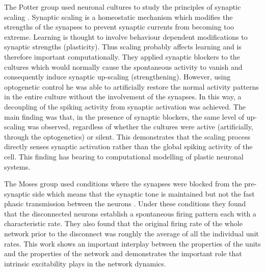     The Potter group used neuronal cultures to study the principles of synaptic scaling \cite{fong2015upward}. Synaptic scaling is a homeostatic mechanism which modifies the strengths of the synapses to prevent synaptic currents from becoming too extreme. Learning is thought to involve behaviour dependent modifications to synaptic strengths (plasticity). Thus scaling probably affects learning and is therefore important computationally. They applied synaptic blockers to the cultures which would normally cause the spontaneous activity to vanish and consequently induce synaptic up-scaling (strengthening). However, using optogenetic control he was able to artificially restore the normal activity patterns in the entire culture without the involvement of the synapses. In this way, a decoupling of the spiking activity from synaptic activation was achieved. The main finding was that, in the presence of synaptic blockers, the same level of up-scaling was observed, regardless of whether the cultures were active (artificially, through the optogenetics) or silent. This demonstrates that the scaling process directly senses synaptic activation rather than the global spiking activity of the cell. This finding has bearing to computational modelling of plastic neuronal systems.

    The Moses group used conditions where the synapses were blocked from the pre-synaptic side which means that the synaptic tone is maintained but not the fast phasic transmission between the neurons \cite{penn2016network}. Under these conditions they found that the disconnected neurons establish a spontaneous firing pattern each with a characteristic rate. They also found that the original firing rate of the whole network prior to the disconnect was roughly the average of all the individual unit rates. This work shows an important interplay between the properties of the units and the properties of the network and demonstrates the important role that intrinsic excitability plays in the network dynamics.

